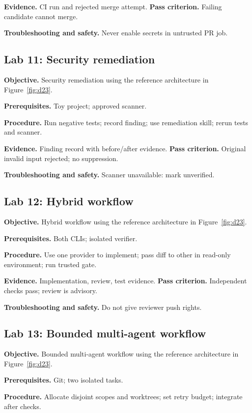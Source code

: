 \textbf{Evidence.} CI run and rejected merge attempt. \textbf{Pass criterion.} Failing candidate cannot merge.

\textbf{Troubleshooting and safety.} Never enable secrets in untrusted PR job.

\subsection{Lab 11: Security remediation}

\textbf{Objective.} Security remediation using the reference architecture in Figure~\ref{fig:d23}.

\textbf{Prerequisites.} Toy project; approved scanner.

\textbf{Procedure.} Run negative tests; record finding; use remediation skill; rerun tests and scanner.

\textbf{Evidence.} Finding record with before/after evidence. \textbf{Pass criterion.} Original invalid input rejected; no suppression.

\textbf{Troubleshooting and safety.} Scanner unavailable: mark unverified.

\subsection{Lab 12: Hybrid workflow}

\textbf{Objective.} Hybrid workflow using the reference architecture in Figure~\ref{fig:d23}.

\textbf{Prerequisites.} Both CLIs; isolated verifier.

\textbf{Procedure.} Use one provider to implement; pass diff to other in read-only environment; run trusted gate.

\textbf{Evidence.} Implementation, review, test evidence. \textbf{Pass criterion.} Independent checks pass; review is advisory.

\textbf{Troubleshooting and safety.} Do not give reviewer push rights.

\subsection{Lab 13: Bounded multi-agent workflow}

\textbf{Objective.} Bounded multi-agent workflow using the reference architecture in Figure~\ref{fig:d23}.

\textbf{Prerequisites.} Git; two isolated tasks.

\textbf{Procedure.} Allocate disjoint scopes and worktrees; set retry budget; integrate after checks.

